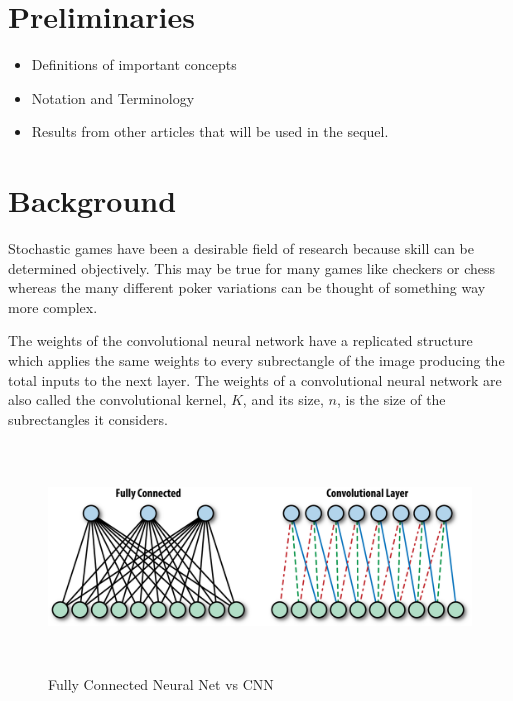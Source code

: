 \documentclass[review]{elsarticle}
\begin{document}
\begin{frontmatter}


\end{frontmatter}

\linenumbers

\section{Preliminaries}

\begin{itemize}
    \item Definitions of important concepts
    \item Notation and Terminology
    \item Results from other articles that will be used in the sequel.
\end{itemize}

\section{Background}

Stochastic games have been a desirable field of research because skill
can be determined objectively. This may be true for many games like
checkers or chess whereas the many different poker variations can be 
thought of something way more complex. 

The weights of the convolutional neural network have a replicated 
structure which applies the same weights to every subrectangle of 
the image producing the total inputs to the next layer. The weights 
of a convolutional neural network are also called the convolutional 
kernel, $K$, and its size, $n$, is the size of the subrectangles it 
considers. \\

\begin{figure}[convectVSFullyConnect]
    \centering
    \includegraphics[width=\textwidth,height=6cm,keepaspectratio=true]{convectVSFullyConnect}
    \caption{
        Fully Connected Neural Net vs CNN ~\cite{ConvecFCN}
    }
    \label{fig:FCN vs. CNN}
\end{figure}
\end{document}
